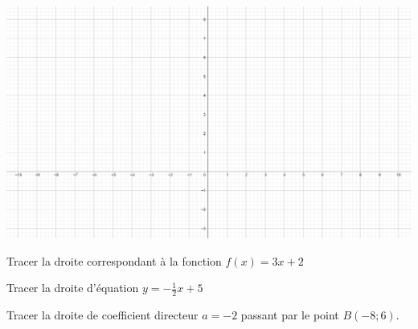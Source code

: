 \section{}


\begin{center}
	\includegraphics[scale=0.5]{vide}
\end{center}
\begin{questions}
	
	
	
	\question[2] Tracer la droite correspondant à la fonction $f(x) = 3x + 2$
	
	
	\fillwithdottedlines{3cm}
	
	\question[2]Tracer la droite d'équation $y  = - \frac{1}{2}x + 5$
	\fillwithdottedlines{3cm}
	
	\question[2] Tracer la droite de coefficient directeur $a = -2$ passant par le point $B(-8; 6)$.
	
	
\end{questions}

\section{}

